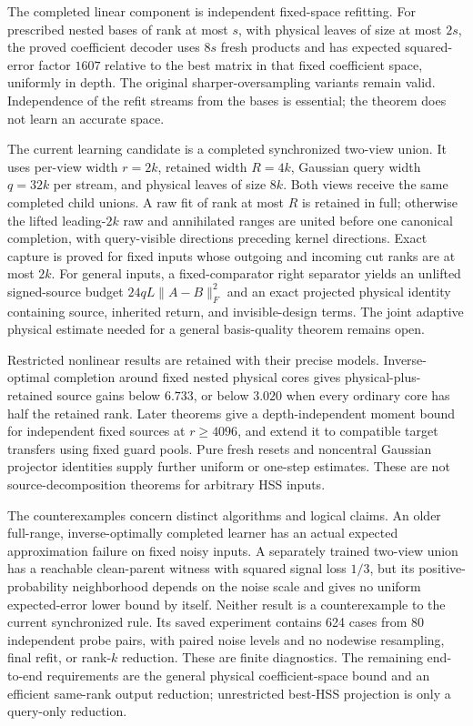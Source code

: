 \documentclass[11pt,oneside,openany,a4paper]{book}
\numberwithin{equation}{chapter}
\theoremstyle{definition}
\theoremstyle{remark}
\begin{document}
The completed linear component is independent fixed-space refitting.
For prescribed nested bases of rank at most $s$, with physical leaves
of size at most $2s$, the proved coefficient decoder uses $8s$ fresh
products and has expected squared-error factor $1607$ relative to the
best matrix in that fixed coefficient space, uniformly in depth.  The
original sharper-oversampling variants remain valid.  Independence of
the refit streams from the bases is essential; the theorem does not
learn an accurate space.

The current learning candidate is a completed synchronized two-view
union.  It uses per-view width $r=2k$, retained width $R=4k$, Gaussian
query width $q=32k$ per stream, and physical leaves of size $8k$.
Both views receive the same completed child unions.  A raw fit of rank
at most $R$ is retained in full; otherwise the lifted leading-$2k$
raw and annihilated ranges are united before one canonical completion,
with query-visible directions preceding kernel directions.  Exact
capture is proved for fixed inputs whose outgoing and incoming cut
ranks are at most $2k$.  For general inputs, a fixed-comparator right
separator yields an unlifted signed-source budget
$24qL\lVert A-B\rVert_F^2$ and an exact projected physical identity
containing source, inherited return, and invisible-design terms.  The
joint adaptive physical estimate needed for a general basis-quality
theorem remains open.

Restricted nonlinear results are retained with their precise models.
Inverse-optimal completion around fixed nested physical cores gives
physical-plus-retained source gains below $6.733$, or below $3.020$
when every ordinary core has half the retained rank.  Later theorems
give a depth-independent moment bound for independent fixed sources
at $r\geq4096$, and extend it to compatible target transfers using
fixed guard pools.  Pure fresh resets and noncentral Gaussian projector
identities supply further uniform or one-step estimates.  These are
not source-decomposition theorems for arbitrary HSS inputs.

The counterexamples concern distinct algorithms and logical claims.
An older full-range, inverse-optimally completed learner has an actual
expected approximation failure on fixed noisy inputs.  A separately
trained two-view union has a reachable clean-parent witness with
squared signal loss $1/3$, but its positive-probability neighborhood
depends on the noise scale and gives no uniform expected-error lower
bound by itself.  Neither result is a counterexample to the current
synchronized rule.  Its saved experiment contains 624 cases from 80
independent probe pairs, with paired noise levels and no nodewise
resampling, final refit, or rank-$k$ reduction.  These are finite
diagnostics.  The remaining end-to-end requirements are the general
physical coefficient-space bound and an efficient same-rank output
reduction; unrestricted best-HSS projection is only a query-only
reduction.
\end{document}
